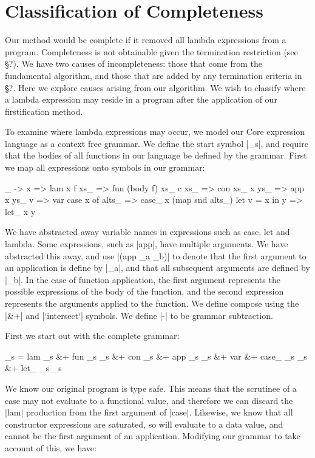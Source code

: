 \documentclass[preprint]{sigplanconf}
\begin{document}
\section{Classification of Completeness}

Our method would be complete if it removed all lambda expressions from a program. Completeness is not obtainable given the termination restriction (see \S?). We have two causes of incompleteness: those that come from the fundamental algorithm, and those that are added by any termination criteria in \S?. Here we explore causes arising from our algorithm. We wish to classify where a lambda expression may reside in a program after the application of our firstification method.

To examine where lambda expressions may occur, we model our Core expression language as a context free grammar. We define the start symbol |_s|, and require that the bodies of all functions in our language be defined by the grammar. First we map all expressions onto symbols in our grammar:

\begin{code}
\vs_ -> x         => lam x
f xs_             => fun (body f) xs_
c xs_             => con xs_
x ys_             => app x ys_
v                 => var
case x of alts_   => case_ x (map snd alts_)
let v = x in y    => let_ x y
\end{code}

We have abstracted away variable names in expressions such as case, let and lambda. Some expressions, such as |app|, have multiple arguments. We have abstracted this away, and use |(app _a _b)| to denote that the first argument to an application is define by |_a|, and that all subsequent arguments are defined by |_b|. In the case of function application, the first argument represents the possible expressions of the body of the function, and the second expression represents the arguments applied to the function. We define compose using the |&+| and |`intersect`| symbols. We define |-| to be grammar subtraction.

First we start out with the complete grammar:

\begin{code}
_s  =  lam _s &+ fun _s _s &+ con _s &+ app _s _s &+ var &+
       case_ _s _s &+ let_ _s _s
\end{code}

We know our original program is type safe. This means that the scrutinee of a case may not evaluate to a functional value, and therefore we can discard the |lam| production from the first argument of |case|. Likewise, we know that all constructor expressions are saturated, so will evaluate to a data value, and cannot be the first argument of an application. Modifying our grammar to take account of this, we have:
\end{document}
